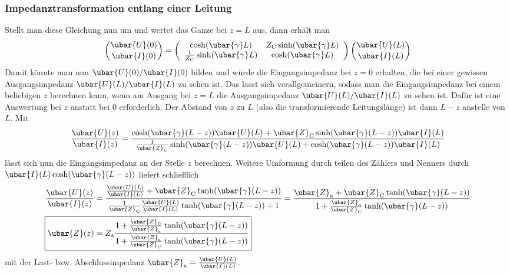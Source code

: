\subsubsection{Impedanztransformation entlang einer Leitung}
Stellt man diese Gleichung nun um und wertet das Ganze bei $z=L$ aus, dann erhält man 
\begin{equation}
\binom{\ubar{U}(0)}{\ubar{I}(0)}=\left(\begin{array}{cc}
	\cosh (\ubar{\gamma} L) & Z_{\mathrm{C}} \sinh (\ubar{\gamma} L)  \\
	\frac{1}{Z_{\mathrm{C}}} \sinh (\ubar{\gamma} L) & \cosh (\ubar{\gamma} L)
\end{array}\right)\binom{\ubar{U}(L)}{\ubar{I}(L)}
\end{equation}
Damit könnte man nun ${\ubar{U}(0)}/{\ubar{I}(0)}$ bilden und würde die Eingangsimpedanz bei $z=0$ erhalten, die bei einer gewissen Ausgangsimpedanz ${\ubar{U}(L)}/{\ubar{I}(L)}$ zu sehen ist. Das lässt sich verallgemeinern, sodass man die Eingangsimpedanz bei einem beliebigen $z$ berechnen kann, wenn am Ausgang bei $z=L$ die Ausgangsimpedanz ${\ubar{U}(L)}/{\ubar{I}(L)}$ zu sehen ist. Dafür ist eine Auswertung bei $z$ anstatt bei $0$ erforderlich. Der Abstand von $z$ zu $L$ (also die transformierende Leitungslänge) ist dann $L-z$ anstelle von $L$. Mit
\begin{equation}
	\frac{\ubar{U}(z)}{\ubar{I}(z)}=\frac{\cosh (\ubar{\gamma}(L-z)) \ubar{U}(L)+\ubar{Z}_{\mathrm{C}} \sinh (\ubar{\gamma}(L-z)) \ubar{I}(L)}{\frac{1}{\ubar{Z}_{\mathrm{C}}} \sinh (\ubar{\gamma}(L-z)) \ubar{U}(L)+\cosh (\ubar{\gamma}(L-z)) \ubar{I}(L)} 
\end{equation}
lässt sich nun die Eingangsimpedanz an der Stelle $z$ berechnen. Weitere Umformung durch teilen des Zählers und Nenners durch $\ubar{I}(L)\cosh (\ubar{\gamma}(L-z))$ liefert schließlich
\begin{align}
	 \frac{\ubar{U}(z)}{\ubar{I}(z)}&=\frac{\frac{\ubar{U}(L)}{\ubar{I}(L)}+\ubar{Z}_{\mathrm{C}} \tanh (\ubar{\gamma}(L-z))}{\frac{1}{\ubar{Z}_{\mathrm{C}}} \frac{\ubar{U}(L)}{\ubar{I}(L)} \tanh (\ubar{\gamma}(L-z))+1}=\frac{\ubar{Z}_{\mathrm{a}}+\ubar{Z}_{\mathrm{C}} \tanh (\ubar{\gamma}(L-z))}{1+\frac{\ubar{Z}_{\mathrm{a}}}{\ubar{Z}_{\mathrm{C}}} \tanh (\ubar{\gamma}(L-z))}  \\
	\Aboxed{\ubar{Z}(z)&=Z_{\mathrm{a}} \frac{1+\frac{\ubar{Z}_{\mathrm{C}}}{\ubar{Z}_{\mathrm{a}}} \tanh (\ubar{\gamma}(L-z))}{1+\frac{\ubar{Z}_{\mathrm{a}}}{\ubar{Z}_{\mathrm{C}}} \tanh (\ubar{\gamma}(L-z))}}
\end{align}
mit der Last- bzw. Abschlussimpedanz $\ubar{Z}_{\mathrm{a}}=\frac{\ubar{U}(L)}{\ubar{I}(L)}$. 
